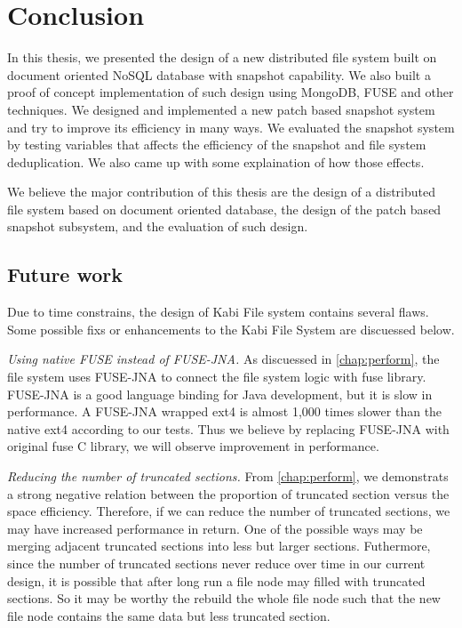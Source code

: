 \chapter{Conclusion}
\label{chap:conclusion}

    In this thesis, we presented the design of a new distributed file system built on document oriented NoSQL database with snapshot capability. We also built a proof of concept implementation of such design using MongoDB, FUSE and other techniques. We designed and implemented a new patch based snapshot system and try to improve its efficiency in many ways. We evaluated the snapshot system by testing variables that affects the efficiency of the snapshot and file system deduplication. We also came up with some explaination of how those effects.

    We believe the major contribution of this thesis are the design of a distributed file system based on document oriented database, the design of the patch based snapshot subsystem, and the evaluation of such design.

\section{Future work}

    Due to time constrains, the design of Kabi File system contains several flaws. Some possible fixs or enhancements to the Kabi File System are discuessed below.
    
    \emph{Using native FUSE instead of FUSE-JNA.} As discuessed in \cref{chap:perform}, the file system uses FUSE-JNA to connect the file system logic with fuse library. FUSE-JNA is a good language binding for Java development, but it is slow in performance\cite{fusejna}. A FUSE-JNA wrapped ext4 is almost 1,000 times slower than the native ext4 according to our tests. Thus we believe by replacing FUSE-JNA with original fuse C library, we will observe improvement in performance.

    \emph{Reducing the number of truncated sections.} From \cref{chap:perform}, we demonstrats a strong negative relation between the proportion of truncated section versus the space efficiency. Therefore, if we can reduce the number of truncated sections, we may have increased performance in return. One of the possible ways may be merging adjacent truncated sections into less but larger sections. Futhermore, since the number of truncated sections never reduce over time in our current design, it is possible that after long run a file node may filled with truncated sections. So it may be worthy the rebuild the whole file node such that the new file node contains the same data but less truncated section.
    
